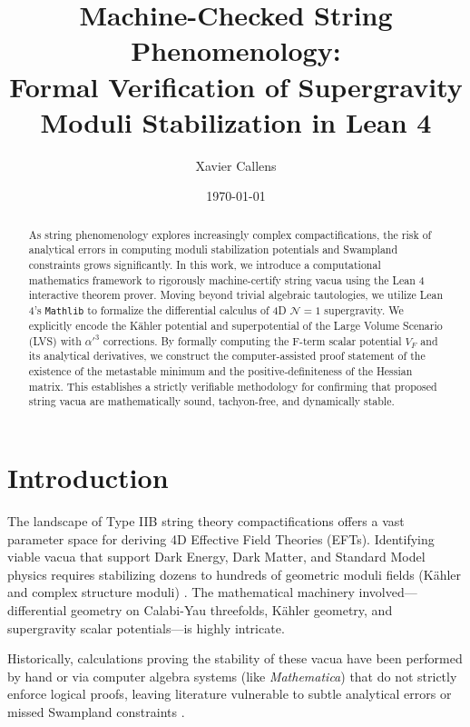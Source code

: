 \documentclass[aps,prd,twocolumn,nofootinbib,superscriptaddress,10pt]{revtex4-2}
\begin{document}
\title{Machine-Checked String Phenomenology: \\ Formal Verification of Supergravity Moduli Stabilization in Lean 4}

\author{Xavier Callens}

\date{\today}

\begin{abstract}
As string phenomenology explores increasingly complex compactifications, the risk of analytical errors in computing moduli stabilization potentials and Swampland constraints grows significantly. In this work, we introduce a computational mathematics framework to rigorously machine-certify string vacua using the Lean 4 interactive theorem prover. Moving beyond trivial algebraic tautologies, we utilize Lean 4's \texttt{Mathlib} to formalize the differential calculus of 4D $\mathcal{N}=1$ supergravity. We explicitly encode the Kähler potential and superpotential of the Large Volume Scenario (LVS) with $\alpha'^3$ corrections. By formally computing the F-term scalar potential $V_F$ and its analytical derivatives, we construct the computer-assisted proof statement of the existence of the metastable minimum and the positive-definiteness of the Hessian matrix. This establishes a strictly verifiable methodology for confirming that proposed string vacua are mathematically sound, tachyon-free, and dynamically stable.
\end{abstract}

\maketitle

\section{Introduction}

The landscape of Type IIB string theory compactifications offers a vast parameter space for deriving 4D Effective Field Theories (EFTs). Identifying viable vacua that support Dark Energy, Dark Matter, and Standard Model physics requires stabilizing dozens to hundreds of geometric moduli fields (Kähler and complex structure moduli) \cite{Balasubramanian2005}. The mathematical machinery involved---differential geometry on Calabi-Yau threefolds, Kähler geometry, and supergravity scalar potentials---is highly intricate. 

Historically, calculations proving the stability of these vacua have been performed by hand or via computer algebra systems (like \textit{Mathematica}) that do not strictly enforce logical proofs, leaving literature vulnerable to subtle analytical errors or missed Swampland constraints \cite{Vafa2005}. 
\end{document}
